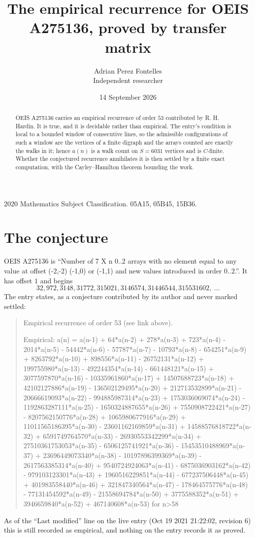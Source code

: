 \documentclass[11pt,a4paper]{article}
\title{The empirical recurrence for OEIS A275136, proved by transfer matrix}
\author{Adrian Perez Fontelles\\ \small Independent researcher}
\date{14 September 2026}
\theoremstyle{plain}
\theoremstyle{definition}
\begin{document}
\maketitle

\begin{abstract}
OEIS A275136 carries an empirical recurrence of order $53$ contributed by R. H. Hardin. It is
true, and it is decidable rather than empirical. The entry's condition is local to a bounded window of consecutive lines, so
the admissible configurations of such a window are the vertices of a finite digraph and the
arrays counted are exactly the walks in it; hence $a(n)$ is a walk count on $S=6031$ vertices
and is $C$-finite. Whether the conjectured recurrence annihilates it is then settled by a
finite exact computation, with the Cayley--Hamilton theorem bounding the work.
\end{abstract}

\noindent\small 2020 Mathematics Subject Classification. 05A15, 05B45, 15B36.\normalsize

\section{The conjecture}

OEIS A275136 is ``Number of 7 X n 0..2 arrays with no element equal to any value at offset (-2,-2) (-1,0) or (-1,1) and new values introduced in order 0..2.''. It has offset $1$ and begins
\[
32, 972, 3148, 31772, 315021, 3146574, 31446544, 315531602,\ \dots
\]
The entry states, as a conjecture contributed by its author and never marked settled:
\begin{quote}\raggedright\small
Empirical recurrence of order 53 (see link above).

Empirical: a(n) = a(n-1) + 64*a(n-2) + 278*a(n-3) + 723*a(n-4) - 2014*a(n-5) - 54442*a(n-6) - 57787*a(n-7) - 10793*a(n-8) - 654251*a(n-9) + 8263792*a(n-10) + 898556*a(n-11) - 26752131*a(n-12) + 199755980*a(n-13) - 492244354*a(n-14) - 661448121*a(n-15) + 3077597870*a(n-16) - 10335961860*a(n-17) + 14507688723*a(n-18) + 42102127886*a(n-19) - 136502129495*a(n-20) + 212713532899*a(n-21) - 20666619093*a(n-22) - 994885987314*a(n-23) + 1753036069074*a(n-24) - 1192863287111*a(n-25) - 1650324887655*a(n-26) + 7550908722421*a(n-27) - 8207562150776*a(n-28) + 1065980677916*a(n-29) + 11011565186395*a(n-30) - 23601162169859*a(n-31) + 14588576818722*a(n-32) + 6591749764570*a(n-33) - 26930553342299*a(n-34) + 27510361753053*a(n-35) - 6506125741921*a(n-36) - 15453510488969*a(n-37) + 23696449073340*a(n-38) - 10197896399369*a(n-39) - 2617563385314*a(n-40) + 9540724924063*a(n-41) - 6875036903162*a(n-42) - 979103123301*a(n-43) + 1960516229851*a(n-44) - 677237506448*a(n-45) + 401983558440*a(n-46) + 321847340564*a(n-47) - 178464575776*a(n-48) - 77131454592*a(n-49) - 21558694784*a(n-50) + 3775588352*a(n-51) + 3946659840*a(n-52) + 467140608*a(n-53) for n>58
\end{quote}
As of the ``Last modified'' line on the live entry (Oct 19 2021 21:22:02, revision 6) this is still
recorded as empirical, and nothing on the entry records it as proved.
\end{document}
